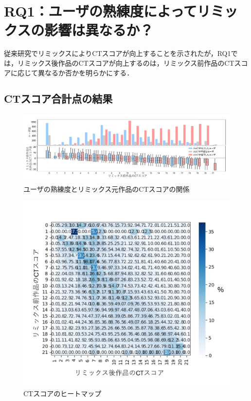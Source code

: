 \documentclass[submit,techrep,noauthor]{ipsj}
\begin{document}
\section{RQ1：ユーザの熟練度によってリミックスの影響は異なるか？}
\label{sec:rq1}

従来研究\cite{10.1145/2724660.2724674}\cite{hashitani2022scratch}\cite{10.1145/2818048.2819984}でリミックスによりCTスコアが向上することを示されたが，RQ1では，リミックス後作品のCTスコアが向上するのは，リミックス前作品のCTスコアに応じて異なるか否かを明らかにする．

\subsection{CTスコア合計点の結果}

\begin{figure}[t]
  \centering
  \includegraphics[width=\textwidth]{@IPSJ_SIGSE202511_Horio/fig/preAnalysis.pdf}
  \caption{ユーザの熟練度とリミックス元作品のCTスコアの関係}
  \label{preAnalysis}
\end{figure}
\begin{figure}[h]
  \centering
  \includegraphics[width=\linewidth]{@IPSJ_SIGSE202511_Horio/fig/heatmapCT.pdf}
  \caption{CTスコアのヒートマップ}
  \label{heatmapCT}
\end{figure}
\end{document}
